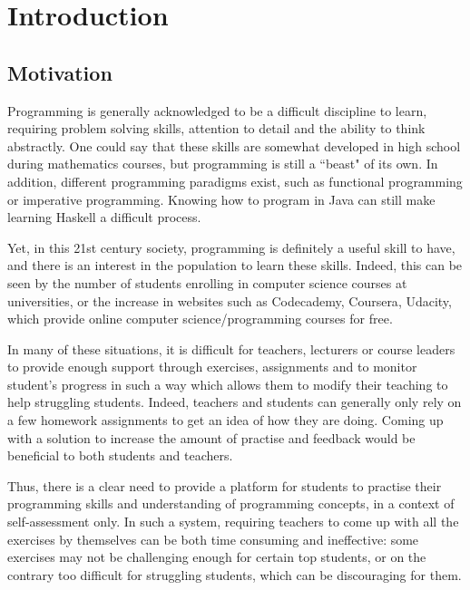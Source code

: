 \chapter{Introduction}

\section{Motivation}
Programming is generally acknowledged to be a difficult discipline to learn, requiring problem solving skills, attention to detail and the ability to think abstractly. One could say that these skills are somewhat developed in high school during mathematics courses, but programming is still a ``beast" of its own. In addition, different programming paradigms exist, such as functional programming or imperative programming. Knowing how to program in Java can still make learning Haskell a difficult process.\newline

Yet, in this 21st century society, programming is definitely a useful skill to have, and there is an interest in the population to learn these skills. Indeed, this can be seen by the number of students enrolling in computer science courses at universities, or the increase in websites such as Codecademy\cite{Codecademy}, Coursera\cite{Coursera}, Udacity\cite{Udacity}, which provide online computer science/programming courses for free.\newline

In many of these situations, it is difficult for teachers, lecturers or course leaders to provide enough support through exercises, assignments and to monitor student's progress in such a way which allows them to modify their teaching to help struggling students. Indeed, teachers and students can generally only rely on a few homework assignments to get an idea of how they are doing. Coming up with a solution to increase the amount of practise and feedback would be beneficial to both students and teachers. \newline

Thus, there is a clear need to provide a platform for students to practise their programming skills and understanding of programming concepts, in a context of self-assessment only. In such a system, requiring teachers to come up with all the exercises by themselves can be both time consuming and ineffective: some exercises may not be challenging enough for certain top students, or on the contrary too difficult for struggling students, which can be discouraging for them.

